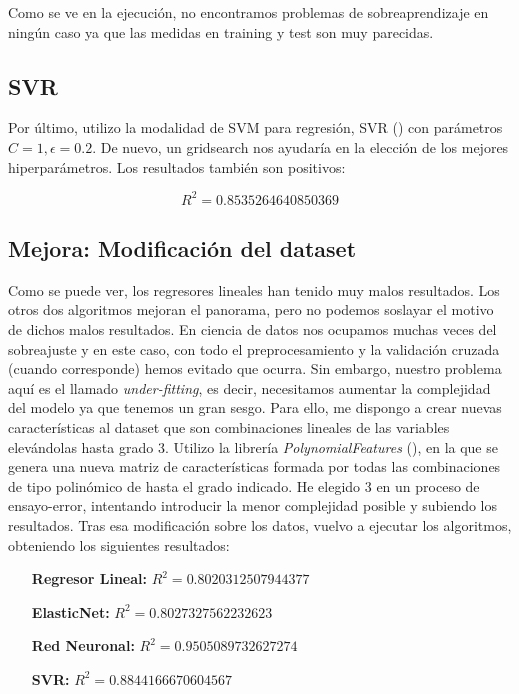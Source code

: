 Como se ve en la ejecución, no encontramos problemas de sobreaprendizaje en ningún caso ya que las medidas en training y test son muy parecidas.

\subsection{SVR}

Por último, utilizo la modalidad de SVM para regresión, SVR (\cite{svr}) con parámetros $C=1, \epsilon = 0.2$. De nuevo, un gridsearch nos ayudaría en la elección de los mejores hiperparámetros. Los resultados también son positivos:

$$R^2 = 0.8535264640850369$$



\subsection{Mejora: Modificación del dataset}
Como se puede ver, los regresores lineales han tenido muy malos resultados. Los otros dos algoritmos mejoran el panorama, pero no podemos soslayar el motivo de dichos malos resultados. En ciencia de datos nos ocupamos muchas veces del sobreajuste y en este caso, con todo el preprocesamiento y la validación cruzada (cuando corresponde) hemos evitado que ocurra. Sin embargo, nuestro problema aquí es el llamado \textit{under-fitting}, es decir, necesitamos aumentar la complejidad del modelo ya que tenemos un gran sesgo. Para ello, me dispongo a crear nuevas características al dataset que son combinaciones lineales de las variables elevándolas hasta grado 3. Utilizo la librería \textit{PolynomialFeatures} (\cite{pf}), en la que se genera una nueva matriz de características formada por todas las combinaciones de tipo polinómico de hasta el grado indicado. He elegido 3 en un proceso de ensayo-error, intentando introducir la menor complejidad posible y subiendo los resultados. Tras esa modificación sobre los datos, vuelvo a ejecutar los algoritmos, obteniendo los siguientes resultados:

\begin{center}

\begin{itemize}
	\centering
	\item[\textbf{Regresor Lineal:}] $R^2 = 0.8020312507944377$
	\item[\textbf{ElasticNet:}] $R^2 = 0.8027327562232623$
	\item[\textbf{Red Neuronal:}] $R^2 = 0.9505089732627274$
	\item[\textbf{SVR:}] $R^2 = 0.8844166670604567$
\end{itemize}
\end{center}

